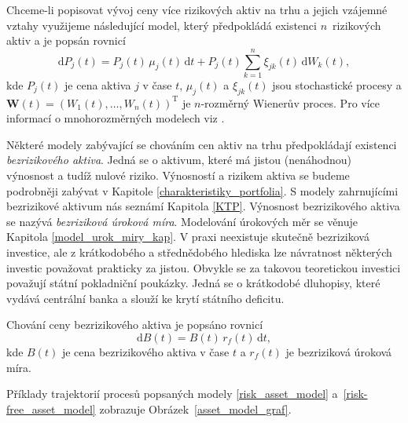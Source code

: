 \documentclass[a4paper,12pt]{report}
\theoremstyle{definition} \newtheorem{definice}[veta]{Definice}
\theoremstyle{remark}
\begin{document}
Chceme-li popisovat vývoj ceny více rizikových aktiv na trhu a jejich vzájemné vztahy využijeme následující model, který předpokládá existenci $n$~rizikových aktiv a je popsán rovnicí
\begin{equation}\label{multi_risk_asset_model}
\mathrm{d}P_j(t)=P_j(t)\,\mu_j(t)\,\mathrm{d}t+P_j(t)\sum_{k=1}^{n}\xi_{jk}(t)\,\mathrm{d}W_k(t),
\end{equation}
kde $P_j(t)$ je cena aktiva $j$ v čase $t$, $\mu_j(t)$ a $\xi_{jk}(t)$ jsou stochastické procesy a $\boldsymbol{W}(t)=(W_1(t),\dots,W_n(t))^\mathrm{T}$ je $n$-rozměrný Wienerův proces. 
Pro více informací o mnohorozměrných modelech viz \cite{etheridge2002course}.

Některé modely zabývající se chováním cen aktiv na trhu předpokládají existenci \textit{bezrizikového aktiva}.
Jedná se o aktivum, které má jistou (nenáhodnou) výnosnost a tudíž nulové riziko.
Výnosností a rizikem aktiva se budeme podrobněji zabývat v Kapitole \ref{charakteristiky_portfolia}. 
S modely zahrnujícími bezrizikové aktivum nás seznámí Kapitola \ref{KTP}.
Výnosnost bezrizikového aktiva se nazývá \textit{bezriziková úroková míra}.
Modelování úrokových měr se věnuje Kapitola \ref{model_urok_miry_kap}.
V praxi neexistuje skutečně bezriziková investice, ale z krátkodobého a střednědobého hlediska lze návratnost některých investic považovat prakticky za jistou.
Obvykle se za takovou teoretickou investici považují státní pokladniční poukázky.
Jedná se o krátkodobé dluhopisy, které vydává centrální banka a slouží ke krytí státního deficitu.

Chování ceny bezrizikového aktiva je popsáno rovnicí
\begin{equation}\label{risk-free_asset_model}
\mathrm{d}B(t)=B(t)\,r_f(t)\,\mathrm{d}t,
\end{equation}
kde $B(t)$ je cena bezrizikového aktiva v čase $t$ a $r_f(t)$ je bezriziková úroková míra.

Příklady trajektorií procesů popsaných modely \eqref{risk_asset_model} a~\eqref{risk-free_asset_model} zobrazuje Obrázek~\ref{asset_model_graf}.
\end{document}

